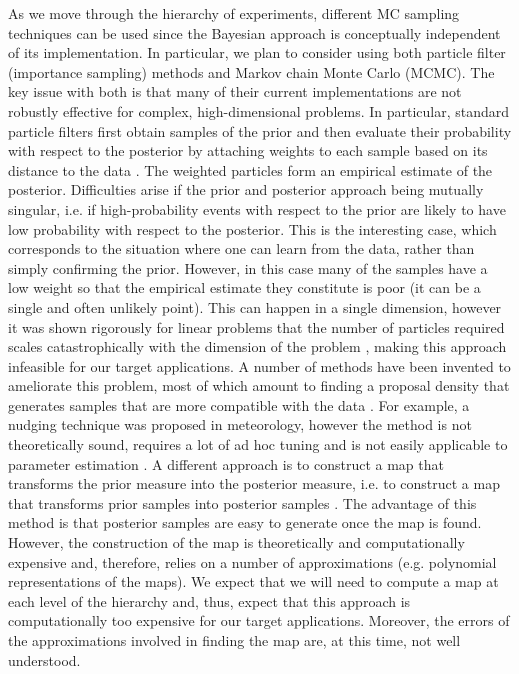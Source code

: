\documentclass[11pt]{article}
\newcommand{\MarginPar}[1]{\marginpar{%
\vskip-\baselineskip %
\raggedright\tiny\sffamily
\hrule\smallskip{\color{red}#1}\par\smallskip\hrule}}
\begin{document}
As we move through the hierarchy of experiments, different MC sampling techniques can be used since the Bayesian approach is conceptually independent of its implementation.
In particular, we plan to consider using both particle filter (importance sampling) methods and Markov chain Monte Carlo (MCMC).
\MarginPar{Matti: started review for sampling}
The key issue with both is that many  of their current implementations are not robustly effective for complex, high-dimensional problems.
In particular, standard particle filters first obtain samples of the prior and then evaluate their probability with respect to the posterior by attaching weights to each sample based on its distance to the data \cite{Doucet2001,GordonSIR}.
The weighted particles form an empirical estimate of the posterior.
Difficulties arise if the prior and posterior approach being mutually singular, i.e. if high-probability events with respect to the prior are likely to have low probability with respect to the posterior.
This is the interesting case, which corresponds to the situation where one can learn from the data, rather than simply confirming the prior.
However, in this case many of the samples have a low weight so that the empirical estimate they constitute is poor (it can be a single and often unlikely point).
This can happen in a single dimension, however it was shown rigorously for linear problems that the number of particles required scales catastrophically with the dimension of the problem \cite{Bickel,BickelBootstrap,Bickel2,Snyder,Weare2012,Weare2009}, making this approach infeasible for our target applications.
A number of methods have been invented to ameliorate this problem, most of which amount to finding a proposal density that  generates samples that are more compatible with the data \cite{Doucet,OptimalImportanceFunction,liuchen1995,Brad}.
For example, a nudging technique was proposed in meteorology, however the method is not theoretically sound, requires a lot of ad hoc tuning  and is not easily applicable to parameter estimation \cite{vanLeeuwen}.
A different approach is to construct a map that transforms the prior measure into the posterior measure, i.e. to construct a map that transforms prior samples into posterior samples \cite{Moselhy2013}.
The advantage of this method is that posterior samples are easy to generate once the map is found.
However, the construction of the map is theoretically and computationally expensive and, therefore, relies on a number of approximations (e.g. polynomial representations of the maps).
We expect that we will need to compute a map at each level of the hierarchy and, thus, expect that this approach is computationally too expensive for our target applications. Moreover, the errors of the approximations involved in finding the map are, at this time, not well understood. 
\end{document}
